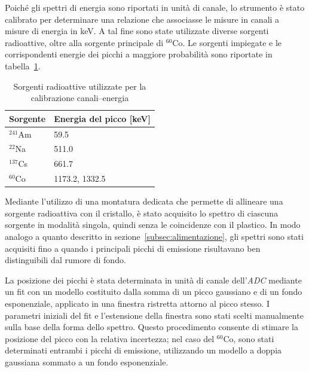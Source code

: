 \documentclass[10pt,twocolumn]{article}
\begin{document}
Poiché gli spettri di energia sono riportati in unità di canale, lo strumento è stato calibrato per determinare una relazione che associasse le misure in canali a misure di energia in keV. A tal fine sono state utilizzate diverse sorgenti radioattive, oltre alla sorgente principale di $^{60}$Co. Le sorgenti impiegate e le corrispondenti energie dei picchi a maggiore probabilità sono riportate in tabella~\ref{tab:sorgenti}.

\begin{table}[ht]
\centering
\begin{tabular}{ll} 
\hline
\noalign{\smallskip}
\textbf{Sorgente} & \textbf{Energia del picco [keV]} \\ [0.5ex] 
\hline
\noalign{\smallskip}
$^{241}$Am 	& 59.5 \\
$^{22}$Na   	& 511.0 \\
$^{137}$Cs  	& 661.7 \\
$^{60}$Co    	& 1173.2, 1332.5 \\
\hline
\end{tabular}
\caption{Sorgenti radioattive utilizzate per la calibrazione canali--energia}
\label{tab:sorgenti}
\end{table}

Mediante l'utilizzo di una montatura dedicata che permette di allineare una sorgente radioattiva con il cristallo, è stato acquisito lo spettro di ciascuna sorgente in modalità singola, quindi senza le coincidenze con il plastico. In modo analogo a quanto descritto in sezione~\ref{subsec:alimentazione}, gli spettri sono stati acquisiti fino a quando i principali picchi di emissione risultavano ben distinguibili dal rumore di fondo. 

La posizione dei picchi è stata determinata in unità di canale dell'\textit{ADC} mediante un fit con un modello costituito dalla somma di un picco gaussiano e di un fondo esponenziale, applicato in una finestra ristretta attorno al picco stesso. I parametri iniziali del fit e l'estensione della finestra sono stati scelti manualmente sulla base della forma dello spettro. Questo procedimento consente di stimare la posizione del picco con la relativa incertezza; nel caso del $^{60}$Co, sono stati determinati entrambi i picchi di emissione, utilizzando un modello a doppia gaussiana sommato a un fondo esponenziale. 
\end{document}
